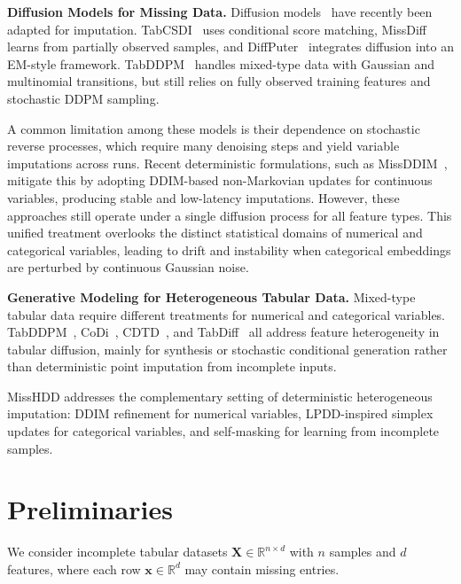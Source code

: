 \documentclass[times, review, 10pt]{elsarticle}
\begin{document}
\textbf{Diffusion Models for Missing Data.}
Diffusion models~\cite{dm1,chang2025design,dreview1} have recently been
adapted for imputation. TabCSDI~\cite{tabcsdi} uses conditional score matching,
MissDiff~\cite{missdiff} learns from partially observed samples, and
DiffPuter~\cite{diffputer} integrates diffusion into an EM-style framework.
TabDDPM~\cite{tabddpm} handles mixed-type data with Gaussian and multinomial
transitions, but still relies on fully observed training features and
stochastic DDPM sampling.

A common limitation among these models is their dependence on stochastic reverse processes, which require many denoising steps and yield variable imputations across runs. Recent deterministic formulations, such as MissDDIM~\cite{missddim}, mitigate this by adopting DDIM-based non-Markovian updates for continuous variables, producing stable and low-latency imputations. However, these approaches still operate under a single diffusion process for all feature types. This unified treatment overlooks the distinct statistical domains of numerical and categorical variables, leading to drift and instability when categorical embeddings are perturbed by continuous Gaussian noise.



\textbf{Generative Modeling for Heterogeneous Tabular Data.}
Mixed-type tabular data require different treatments for numerical and
categorical variables. TabDDPM~\cite{tabddpm}, CoDi~\cite{codi},
CDTD~\cite{cdtd}, and TabDiff~\cite{tabdiff} all address feature heterogeneity
in tabular diffusion, mainly for synthesis or stochastic conditional
generation rather than deterministic point imputation from incomplete inputs.

MissHDD addresses the complementary setting of deterministic heterogeneous
imputation: DDIM refinement for numerical variables, LPDD-inspired simplex
updates for categorical variables, and self-masking for learning from
incomplete samples.


\section{Preliminaries}

We consider incomplete tabular datasets $\mathbf{X} \in \mathbb{R}^{n \times d}$ with $n$ samples and $d$ features, where each row $\mathbf{x} \in \mathbb{R}^d$ may contain missing entries.


\end{document}
